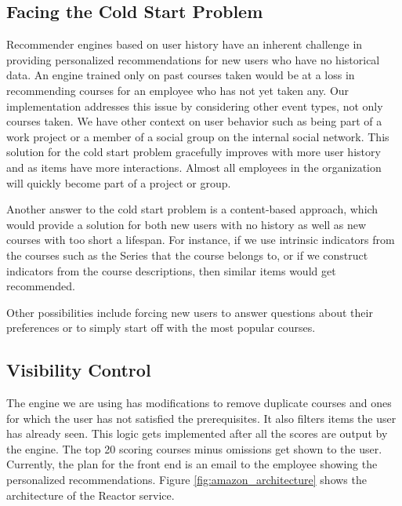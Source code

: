 \documentclass[12pt,journal]{IEEEtran}
\begin{document}
\subsection{Facing the Cold Start Problem}

Recommender engines based on user history have an inherent challenge in providing personalized recommendations for new users who have no historical data.  An engine trained only on past courses taken would be at a loss in recommending courses for an employee who has not yet taken any.  Our implementation addresses this issue by considering other event types, not only courses taken.  We have other context on user behavior such as being part of a work project or a member of a social group on the internal social network.  This solution for the cold start problem gracefully improves with more user history and as items have more interactions.  Almost all employees in the organization will quickly become part of a project or group.

Another answer to the cold start problem is a content-based approach, which would provide a solution for both new users with no history as well as new courses with too short a lifespan.  For instance, if we use intrinsic indicators from the courses such as the Series that the course belongs to, or if we construct indicators from the course descriptions, then similar items would get recommended.

Other possibilities include forcing new users to answer questions about their preferences or to simply start off with the most popular courses.

\subsection{Visibility Control}

The engine we are using has modifications to remove duplicate courses and ones for which the user has not satisfied the prerequisites.  It also filters items the user has already seen.  This logic gets implemented after all the scores are output by the engine.  The top 20 scoring courses minus omissions get shown to the user.  Currently, the plan for the front end is an email to the employee showing the personalized recommendations.  Figure \ref{fig:amazon_architecture} shows the architecture of the Reactor service.
\end{document}

